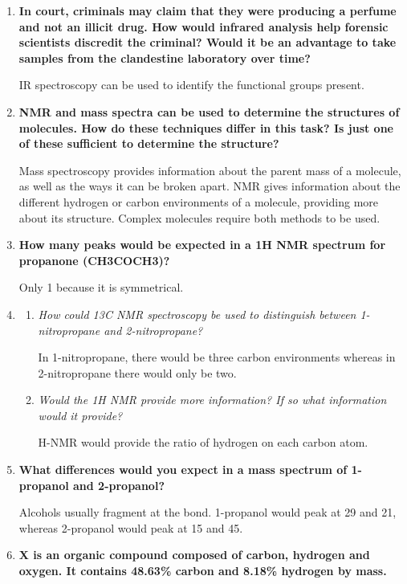 \documentclass{report}
\begin{document}
\begin{enumerate}
		\item \textbf{In court, criminals may claim that they were producing a perfume and not an illicit drug. How would infrared analysis help forensic scientists discredit the criminal? Would it be an advantage to take samples from the clandestine laboratory over time?}

			IR spectroscopy can be used to identify the functional groups present.

		\item \textbf{NMR and mass spectra can be used to determine the structures of molecules. How do these techniques differ in this task? Is just one of these sufficient to determine the structure?}

			Mass spectroscopy provides information about the parent mass of a molecule, as well as the ways it can be broken apart. NMR gives information about the different hydrogen or carbon environments of a molecule, providing more about its structure. Complex molecules require both methods to be used.

		\item \textbf{How many peaks would be expected in a 1H NMR spectrum for propanone (CH3COCH3)?}

			Only 1 because it is symmetrical.

		\item 
			\begin{enumerate}
				\item \textit{How could 13C NMR spectroscopy be used to distinguish between 1-nitropropane and 2-nitropropane?}

					In 1-nitropropane, there would be three carbon environments whereas in 2-nitropropane there would only be two.

				\item \textit{Would the 1H NMR provide more information? If so what information would it provide?}

					H-NMR would provide the ratio of hydrogen on each carbon atom.
			\end{enumerate}

		\item \textbf{What differences would you expect in a mass spectrum of 1-propanol and 2-propanol?}

			Alcohols usually fragment at the  bond. 1-propanol would peak at 29 and 21, whereas 2-propanol would peak at 15 and 45.

		\item \textbf{X is an organic compound composed of carbon, hydrogen and oxygen. It contains 48.63\% carbon and 8.18\% hydrogen by mass.}


\end{enumerate}
\end{document}
